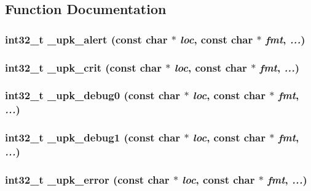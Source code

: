 \subsection{Function Documentation}
\subsubsection{\setlength{\rightskip}{0pt plus 5cm}int32\_\-t \_\-upk\_\-alert (const char $\ast$ {\em loc}, const char $\ast$ {\em fmt},  {\em ...})}\label{error_8h_ea74d3a0830932ca28de5d865f8b418d}


\subsubsection{\setlength{\rightskip}{0pt plus 5cm}int32\_\-t \_\-upk\_\-crit (const char $\ast$ {\em loc}, const char $\ast$ {\em fmt},  {\em ...})}\label{error_8h_6d3bd493281b0e459e5a0171323f62eb}


\subsubsection{\setlength{\rightskip}{0pt plus 5cm}int32\_\-t \_\-upk\_\-debug0 (const char $\ast$ {\em loc}, const char $\ast$ {\em fmt},  {\em ...})}\label{error_8h_237d0ac563130db3c1682178ce483214}


\subsubsection{\setlength{\rightskip}{0pt plus 5cm}int32\_\-t \_\-upk\_\-debug1 (const char $\ast$ {\em loc}, const char $\ast$ {\em fmt},  {\em ...})}\label{error_8h_c13d9fed61710e8ce9dbe2611994f209}


\subsubsection{\setlength{\rightskip}{0pt plus 5cm}int32\_\-t \_\-upk\_\-error (const char $\ast$ {\em loc}, const char $\ast$ {\em fmt},  {\em ...})}\label{error_8h_f47566875637733fb8629ae958052c7b}


